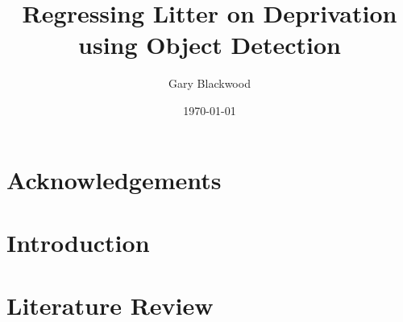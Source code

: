 \documentclass{thesis}
\begin{document}

\title{Regressing Litter on Deprivation using Object Detection}
\author{Gary Blackwood}
\date{\today}
\maketitle


\begin{abstract}
\end{abstract}


\chapter*{Acknowledgements}


\tableofcontents


\chapter{Introduction}



\chapter{Literature Review}
\end{document}
